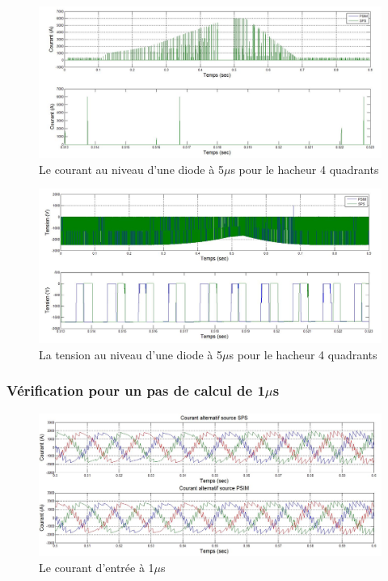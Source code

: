 \documentclass[11pt,letterpaper,final]{report}
\begin{document}
\begin{figure}[htb]
\centering
\includegraphics[scale=0.5]{Fig/DCP_AFE/5u/hash_diode_cou.jpg}
\caption{Le courant au niveau d'une diode à 5$\mu$s pour le hacheur 4 quadrants}
\label{AF_DC_HA5}
\end{figure}

\begin{figure}[htb]
\centering
\includegraphics[scale=0.5]{Fig/DCP_AFE/5u/hash_diode.jpg}
\caption{La tension au niveau d'une diode à 5$\mu$s pour le hacheur 4 quadrants}
\label{AF_DC_HV5}
\end{figure}


\clearpage
\subsubsection{Vérification pour un pas de calcul de 1$\mu$s}

\begin{figure}[htb]
\centering
\includegraphics[scale=0.5]{Fig/DCP_AFE/1u/cour_al.jpg}
\caption{Le courant d'entrée à 1$\mu$s}
\label{AF_DC_cou1}
\end{figure}
\end{document}
